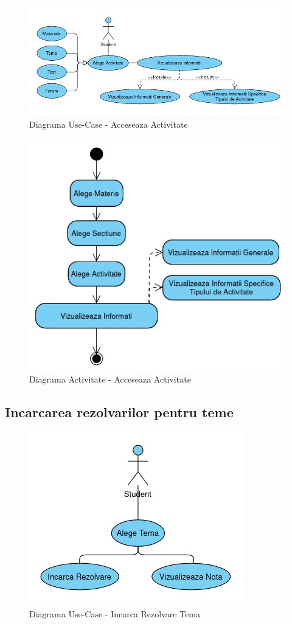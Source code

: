 \documentclass[12pt, a4paper, oneside, romanian]{teza-upb}
\begin{document}
\begin{figure}[H]
\centering
\includegraphics*[width=\columnwidth]{diagrama-use-case-acceseaza-activitate}
\caption{Diagrama Use-Case - Acceseaza Activitate}
\label{diagrama-use-case-acceseaza-activitate}
\end{figure}


\begin{figure}[H]
\centering
\includegraphics*[width=0.6\columnwidth]{diagrama-activitate-acceseaza-activitate}
\caption{Diagrama Activitate - Acceseaza Activitate}
\label{diagrama-activitate-acceseaza-activitate}
\end{figure}

\subsection{Incarcarea rezolvarilor pentru teme}

\begin{figure}[H]
\centering
\includegraphics*[width=0.5\columnwidth]{diagrama-use-case-incarca-rezolvare-tema}
\caption{Diagrama Use-Case - Incarca Rezolvare Tema}
\label{diagrama-use-case-incarca-rezolvare-tema}
\end{figure}
\end{document}
